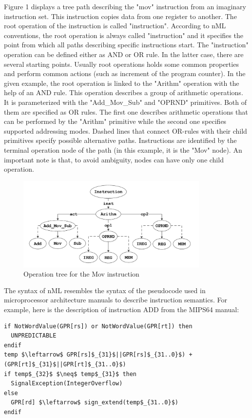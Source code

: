 \documentclass[oneside,final,14pt]{extreport}
\begin{document}
Figure 1 displays a tree path describing the "mov" instruction from an
imaginary instruction set. This instruction copies data from one register to
another. The root operation of the instruction is called "instruction".
According to nML conventions, the root operation is always called "instruction"
and it specifies the point from which all paths describing specific
instructions start. The "instruction" operation can be defined either as AND or
OR rule. In the latter case, there are several starting points. Usually root
operations holds some common properties and perform common actions (such as
increment of the program counter). In the given example, the root operation is
linked to the "Arithm" operation with the help of an AND rule. This operation
describes a group of arithmetic operations. It is parameterized with the
"Add{\_}Mov{\_}Sub" and "OPRND" primitives. Both of them are specified as OR rules.
The first one describes arithmetic operations that can be performed by the
"Arithm" primitive while the second one specifies supported addressing modes.
Dashed lines that connect OR-rules with their child primitives specify possible
alternative paths. Instructions are identified by the terminal operation node of
the path (in this example, it is the "Mov" node). An important note is that, to
avoid ambiguity, nodes can have only one child operation.

\begin{figure}
\centering
\includegraphics [width=0.85\textwidth]
{figures/figure1.pdf}
\caption{Operation tree for the Mov instruction}
\label{nml-instruction-tree}
\end{figure}

The syntax of nML resembles the syntax of the pseudocode used in microprocessor
architecture manuals to describe instruction semantics. For example, here is the
description of instruction ADD from the MIPS64 manual:

\begin{lstlisting}[mathescape=true]
if NotWordValue(GPR[rs]) or NotWordValue(GPR[rt]) then
  UNPREDICTABLE
endif
temp $\leftarrow$ GPR[rs]$_{31}$||GPR[rs]$_{31..0}$) + (GPR[rt]$_{31}$||GPR[rt]$_{31..0}$)
if temp$_{32}$ $\neq$ temp$_{31}$ then
  SignalException(IntegerOverflow)
else
  GPR[rd] $\leftarrow$ sign_extend(temp$_{31..0}$)
endif
\end{lstlisting}
\end{document}
